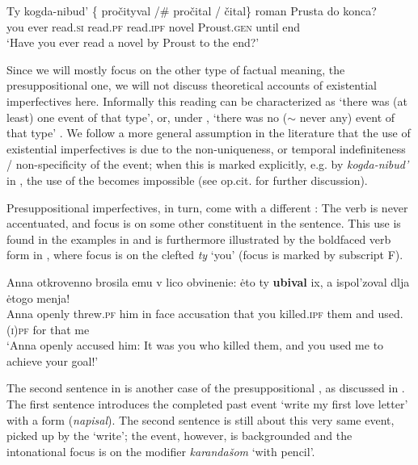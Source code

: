 \documentclass[output=paper,modfonts,newtxmath,hidelinks
\ChapterDOI{10.5281/zenodo.2545513}
]{langscibook}
\begin{document}
\ea\gll Ty kogda-nibud' \{\hspace{-2pt} pročityval /\#\hspace{-2pt} pročital / čital\} roman Prusta do konca? \\
you ever {} read.\textsc{si} {} read.\textsc{pf} {} read.\textsc{ipf} novel Proust.\textsc{gen} until end\\
\glt `Have you ever read a novel by Proust to the end?' \hfill \citep[][73]{gronndiss}\label{Proust}
\z

\noindent Since we will mostly focus on the other type of factual meaning, the presuppositional one, we will not discuss theoretical accounts of existential imperfectives here. Informally this reading can be characterized as `there was (at least) one event of that type', or, under , `there was no ($\sim$ never any) event of that type' \citep[see][]{mehlig01, mehlig13, muellerkrat, muellerPI, gehrkemueller}. We follow a more general assumption in the literature that the use of existential imperfectives is due to the non-uniqueness, or temporal indefiniteness / non-specificity of the event; when this is marked explicitly, e.g. by \textit{kogda-nibud'} in , the use of the  becomes impossible (see op.cit. for further discussion). 

Presuppositional imperfectives, in turn, come with a different : The verb is never accentuated, and  focus is on some other constituent in the sentence. This  use is found in the examples in  and is furthermore illustrated by the boldfaced verb form in , where focus is on the clefted  \textit{ty} `you' (focus is marked by subscript F).

\ea\gll	Anna otkrovenno brosila emu v lico obvinenie: \.{e}to ty \textbf{ubival} ix, a ispol'zoval dlja \.{e}togo menja!\\ 						
	Anna openly threw.\textsc{pf} him in face accusation that you killed.\textsc{ipf} them and used.\textsc{(i)pf} for that me\\
\glt	`Anna openly accused him: It was you who killed them, and you used me to achieve your goal!' \hfill \citep[after][131]{gronndiss}\label{Anna}
\z

\noindent The second sentence in  \citep[attributed to][]{forsyth70} is another case of the presuppositional , as discussed in \citet[][192f.]{gronndiss}. The first sentence introduces the completed past event `write my first love letter' with a  form (\textit{napisal}). The second sentence is still about this very same event, picked up by the  `write'; the event, however, is backgrounded and the intonational focus is on the modifier \textit{karandašom} `with pencil'.
\end{document}
